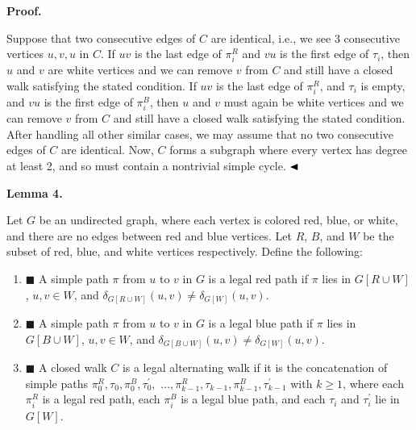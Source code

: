 \documentclass[10pt,a4paper]{article}
\begin{document}
\par
\par
\par
\par\medskip\noindent\textbf{Proof.}\par
Suppose that two consecutive edges of $C$ are identical, i.e., we see 3 consecutive vertices $u,v,u$ in $C$. If $uv$ is the last edge of $\pi^{R}_{i}$ and $vu$ is the first edge of $\tau_{i}$, then $u$ and $v$ are white vertices and we can remove $v$ from $C$ and still have a closed walk satisfying the stated condition. If $uv$ is the last edge of $\pi^{R}_{i}$, and $\tau_{i}$ is empty, and $vu$ is the first edge of $\pi^{B}_{i}$, then $u$ and $v$ must again be white vertices and we can remove $v$ from $C$ and still have a closed walk satisfying the stated condition. After handling all other similar cases, we may assume that no two consecutive edges of $C$ are identical. Now, $C$ forms a subgraph where every vertex has degree at least 2, and so must contain a nontrivial simple cycle. $\hfill\blacktriangleleft$
\par
\par
\par\medskip\noindent\textbf{Lemma 4.}\par
Let $G$ be an undirected graph, where each vertex is colored red, blue, or white, and there are no edges between red and blue vertices. Let $R$, $B$, and $W$ be the subset of red, blue, and white vertices respectively. Define the following:
\par
\begin{enumerate}
\item[]  $\blacksquare$ 
A simple path $\pi$ from $u$ to $v$ in $G$ is a legal red path if $\pi$ lies in $G[R\cup W]$, $u,v\in W$, and $\delta_{G[R\cup W]}(u,v)\neq\delta_{G[W]}(u,v)$.
\par
\par
\item[]  $\blacksquare$ 
A simple path $\pi$ from $u$ to $v$ in $G$ is a legal blue path if $\pi$ lies in $G[B\cup W]$, $u,v\in W$, and $\delta_{G[B\cup W]}(u,v)\neq\delta_{G[W]}(u,v)$.
\par
\par
\item[]  $\blacksquare$ 
A closed walk $C$ is a legal alternating walk if it is the concatenation of simple paths $\pi^{R}_{0},\tau_{0},\pi^{B}_{0},\tau^{\prime}_{0},$ $\ldots,\pi^{R}_{k-1},\tau_{k-1},\pi^{B}_{k-1},\tau^{\prime}_{k-1}$ with $k\geq 1$, where each $\pi^{R}_{i}$ is a legal red path, each $\pi^{B}_{i}$ is a legal blue path, and each $\tau_{i}$ and $\tau^{\prime}_{i}$ lie in $G[W]$.
\par
\par
\end{enumerate}
\end{document}
